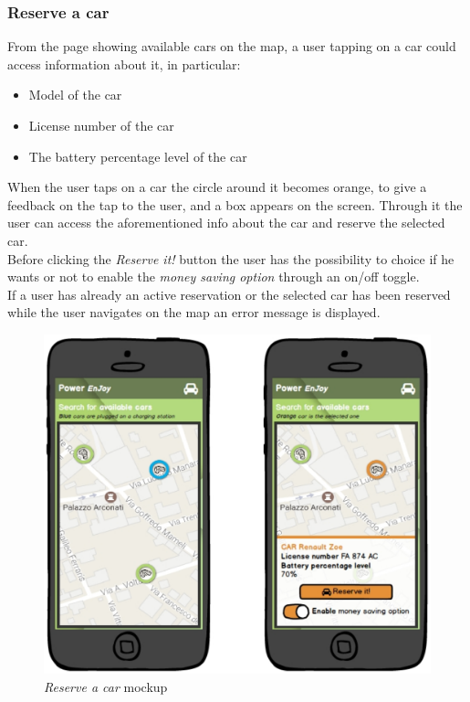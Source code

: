 \subsubsection{Reserve a car}

From the page showing available cars on the map, a user tapping on a car could access information about it, in particular:
\begin{itemize}
	\item Model of the car
	\item License number of the car
	\item The battery percentage level of the car
\end{itemize}

When the user taps on a car the circle around it becomes orange, to give a feedback on the tap to the user, and a box appears on the screen. Through it the user can access the aforementioned info about the car and reserve the selected car. \\

Before clicking the \emph{Reserve it!} button the user has the possibility to choice if he wants or not to enable the \emph{money saving option} through an on/off toggle.\\

If a user has already an active reservation or the selected car has been reserved while the user navigates on the map an error message is displayed.\\

\begin{figure}[h]
			\centering
			\includegraphics[width=0.9\linewidth]{mockups/reserveCar}
			\caption{
				\label{fig:reserveCar} 
				\emph{Reserve a car} mockup
			}
		\end{figure}
		
